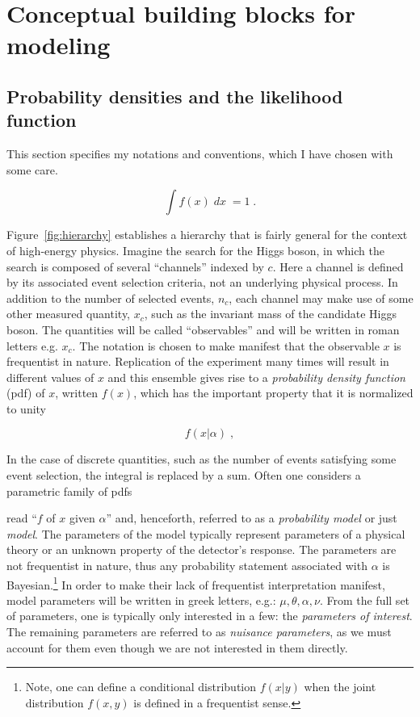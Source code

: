 \section{Conceptual building blocks for modeling}


\subsection{Probability densities and the likelihood function}


This section specifies my notations and conventions, which I have chosen with some care.%


\begin{equation}
\int  f(x) \;dx\;= 1\;.
\end{equation}

Figure~\ref{fig:hierarchy} establishes a hierarchy that is fairly general for the context of high-energy physics.  Imagine the search for the Higgs boson, in which the search is composed of several ``channels'' indexed by $c$.  Here a channel is defined by its associated event selection criteria, not an underlying physical process.  In addition to the number of selected events, $n_c$, each channel may make use of some other measured quantity, $x_c$, such as the invariant mass of the candidate Higgs boson. The quantities will be called ``observables'' and will be written in roman letters e.g. $x_c$. The notation is chosen to make manifest that the observable $x$ is  frequentist in nature.  Replication of the experiment many times will result in different values of $x$ and this ensemble gives rise to a \emph{probability density function} (pdf) of $x$, written $f(x)$, which has the important property that it is normalized to unity



\begin{equation}
f(x | \alpha) \;,
\end{equation}


In the case of discrete quantities, such as the number of events satisfying some event selection, the integral is replaced by a sum.  Often one considers a parametric family of pdfs


read ``$f$ of $x$ given $\alpha$''  and, henceforth, referred to as a \emph{probability model} or just \emph{model}.  The parameters of the model typically represent parameters of a physical theory or an unknown property of the detector's response.  The parameters are not frequentist in nature, thus any probability statement associated with $\alpha$ is Bayesian.\footnote{Note, one can define a conditional distribution $f(x|y)$ when the joint distribution $f(x,y)$ is defined in a frequentist sense.}  In order to make their lack of frequentist interpretation manifest, model parameters will be written in greek letters, e.g.: $\mu, \theta, \alpha, \nu$.%
From the full set of parameters, one is typically only interested in a few: the \emph{parameters of interest}.  The remaining parameters are  referred to as \emph{nuisance parameters}, as we must account for them even though we are not interested in them directly.


